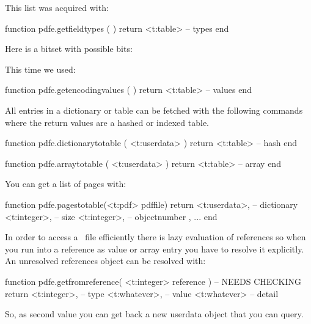 This list was acquired with:

\starttyping[option=LUA]
function pdfe.getfieldtypes ( )
    return <t:table> -- types
end
\stoptyping

Here  is a bitset with possible bits:

\startfourrows
{}
\stopfourrows

This time we used:

\starttyping[option=LUA]
function pdfe.getencodingvalues ( )
    return <t:table> -- values
end
\stoptyping

\stopsubsection

\startsubsection[title={Getting tables}]

All entries in a dictionary or table can be fetched with the following commands
where the return values are a hashed or indexed table.

\starttyping[option=LUA]
function pdfe.dictionarytotable ( <t:userdata> )
    return <t:table> -- hash
end

function pdfe.arraytotable ( <t:userdata> )
    return <t:table> -- array
end
\stoptyping

You can get a list of pages with:

\starttyping[option=LUA]
function pdfe.pagestotable(<t:pdf> pdffile)
    return {
        {
            <t:userdata>, -- dictionary
            <t:integer>,  -- size
            <t:integer>,  -- objectnumber
        },
        ...
    }
end
\stoptyping

\stopsubsection

\startsubsection[title={References}]

In order to access a \PDF\ file efficiently there is lazy evaluation of
references so when you run into a reference as value or array entry you have to
resolve it explicitly. An unresolved references object can be resolved with:

\starttyping
function pdfe.getfromreference( <t:integer> reference ) -- NEEDS CHECKING
    return
        <t:integer>,  -- type
        <t:whatever>, -- value
        <t:whatever>  -- detail
\stoptyping

So, as second value you can get back a new  userdata object that you
can query.

\stopsubsection

\stopsection

\stopdocument
